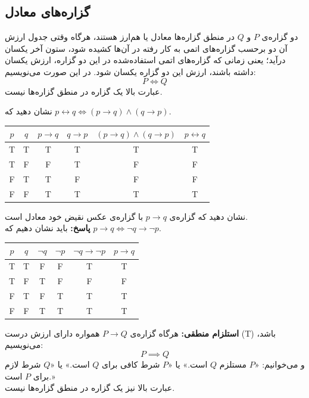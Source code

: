 \subsection{گزاره‌های معادل}
دو گزاره‌ی $P$ و $Q$ در منطق گزاره‌ها معادل یا هم‌ارز هستند، هرگاه وقتی جدول ارزش آن دو برحسب گزاره‌های اتمی به کار رفته در آن‌ها کشیده شود، ستون آخر یکسان درآید؛ یعنی زمانی که گزاره‌های اتمی استفاده‌شده در این دو گزاره، ارزش یکسان داشته باشند، ارزش این دو گزاره یکسان شود. در این صورت می‌نویسیم:
$$P \iff Q$$
عبارت بالا یک گزاره در منطق گزاره‌ها نیست.
\smallskip
\begin{example}
	نشان دهید که
	$p \leftrightarrow q \iff (p \rightarrow q) \wedge (q \rightarrow p)$.
	\begin{table}[H]
		\centering
		\begin{latin}
			\begin{tabular}{c|c|c|c|c|c}
				$p$ & $q$ & $p \rightarrow q$ & $q \rightarrow p$ & $(p \rightarrow q) \wedge (q \rightarrow p)$ & $p \leftrightarrow q$ \\
				\hline
				T & T & T & T & T & T \\
				T & F & F & T & F & F \\
				F & T & T & F & F & F \\
				F & F & T & T & T & T
			\end{tabular}
		\end{latin}
	\end{table}
\end{example}

\begin{example}
	نشان دهید که گزاره‌ی
	$p \rightarrow q$
	با گزاره‌ی عکس نقیض خود معادل است. \\
	\textbf{پاسخ:}
	باید نشان دهیم که
	$p \rightarrow q \iff \neg q \rightarrow \neg p$.
	\begin{table}[H]
		\centering
		\begin{latin}
			\begin{tabular}{c|c|c|c|c|c}
				$p$ & $q$ & $\neg q$ & $\neg p$ & $\neg q \rightarrow \neg p$ & $p \rightarrow q$ \\
				\hline
				T & T & F & F & T & T \\
				T & F & T & F & F & F \\
				F & T & F & T & T & T \\
				F & F & T & T & T & T
			\end{tabular}
		\end{latin}
	\end{table}
\end{example}
\smallskip
\textbf{استلزام منطقی:}
هرگاه گزاره‌ی
$P \rightarrow Q$
همواره دارای ارزش درست (T) باشد، می‌نویسیم:
$$P \implies Q$$
و می‌خوانیم: «$P$ مستلزم $Q$ است.» یا «$P$ شرط کافی برای $Q$ است.» یا «$Q$ شرط لازم برای $P$ است.» \\
عبارت بالا نیز یک گزاره در منطق گزاره‌ها نیست.

